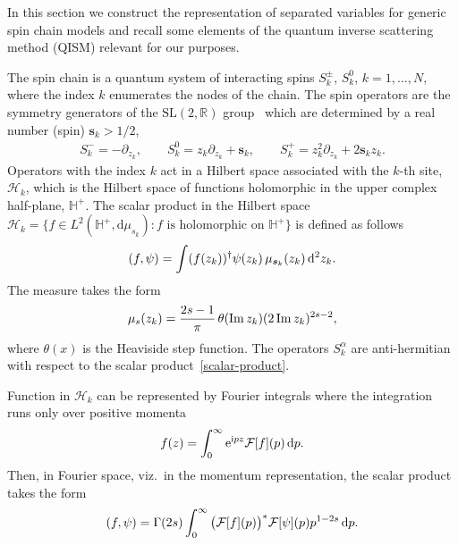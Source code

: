 \documentclass[pdftex]{sigma}%
\numberwithin{equation}{section}
\begin{document}
In this section we construct the representation of separated variables for generic spin chain models and recall some elements of
the quantum inverse scattering method (QISM) relevant for our purposes.

The spin chain is a quantum system of interacting spins $S_k^\pm$, $S^0_k$, $k=1,\dots, N$, where the index $k$ enumerates the nodes of the
chain. The spin operators are the symmetry generators of the $\mathrm{SL}(2,\mathbb R)$ group~\cite{MR0207913} which are determined by a
real number (spin) $\boldsymbol s_k>1/2$,
\begin{gather*}
S_k^-=-\partial_{z_k},\qquad
S_k^0=z_k\partial_{z_k}+\boldsymbol s_k,\qquad
S_k^+=z^2_k\partial_{z_k}+2\boldsymbol s_k z_k.
\end{gather*}
Operators with the index $k$ act in a Hilbert space associated with the $k$-th site, $\mathcal H_k$, which is the Hilbert space of
functions holomorphic in the upper complex half-plane, $\mathbb H^+$. The scalar product in the Hilbert space $\mathcal H_k=\big\{ f \in
L^2(\mathbb H^+,\mathrm{d}\mu_{s_k})\colon f \text{ is holomorphic on } \mathbb H^+ \big\}$ is defined as follows
\begin{gather}\label{scalar-product}
(f,\psi)=\int(f(z_k))^\dagger \psi(z_k)\, \mu_{\boldsymbol s_k}(z_k)\,{\rm d}^2z_k.
\end{gather}
The measure takes the form
\begin{gather}
\mu_{s}(z_k)=\frac{2s-1}{\pi}\,\theta(\mathop{\rm Im}z_k)
(2\mathop{\rm Im} z_k)^{2 s-2},
\label{def-measure}
\end{gather}
where $\theta(x)$ is the Heaviside step function.
 The operators $S_k^\alpha$ are anti-hermitian with respect to the scalar product~\eqref{scalar-product}.

Function in $\mathcal H_k$ can be represented by Fourier integrals where the integration runs only over positive momenta
\begin{gather*}
f(z)=\int_0^\infty {\rm e}^{{\rm i}p z} \mathcal{F}[f](p)\, {\rm d}p.
\end{gather*}
Then, in Fourier space, viz.~in the momentum representation, the scalar product takes the form
\begin{gather*}
(f,\psi) =\Gamma(2s) \int_0^\infty \big( \mathcal{F}[f](p) \big)^* \mathcal{F}[\psi](p) p^{1-2s} \, {\rm d}p.
\end{gather*}
\end{document}
